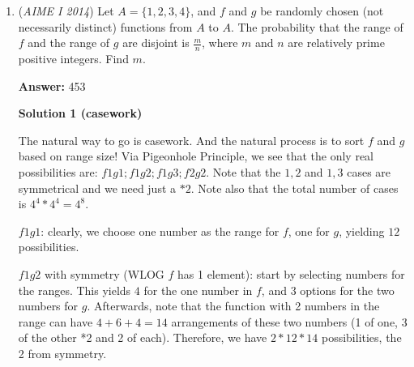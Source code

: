 \begin{enumerate}
For any point $(x,y)$ on the coordinate plane, we can represent it as the term $a^xb^y$. Then, moving right is equivalent to multiplying by $a$, moving left is equivalent to multiplying by $1/a$, and similarly for up/down with $b$ and $1/b$. Because, on every move, the possibilities are these four directions, and each is equally likely, each move can be represented by multiplying by $a+\frac{1}{a}+b+\frac{1}{b}$. Thus, the possibilities after $6$ moves are the same as the coefficients of $\left(a+\frac{1}{a}+b+\frac{1}{b}\right)^6$. By symmetry, we just need to find the number of ways for the token to reach $(0,0),(1,1),(2,2),\text{ and }(3,3)$. By the multinomial theorem, the coefficient of $a^3b^3$ is $\binom{6}{3,3}=20$. Similarly, the coefficient of $a^2b^2$ is $2\binom{6}{3,2,1}=120$. The coefficient of $ab$ is $\binom{6}{2,2,1,1}+2\binom{6}{3,2,1}=300$. Finally, the constant term is $2\binom{6}{2,2,1,1}+2\binom{6}{3,3}=400$. Because the total number of possibilities is $4^6$, the probability is 
 \[\frac{4(20+120+300)+400}{4^6}=\frac{5+30+75+25}{4^4}=\frac{135}{256},\]and the answer is $391$.--brainiacmaniac31

 


 


	\item (\textit{AIME I 2014}) Let $A=\{1,2,3,4\}$, and $f$ and $g$ be randomly chosen (not necessarily distinct) functions from $A$ to $A$. The probability that the range of $f$ and the range of $g$ are disjoint is $\frac{m}{n}$, where $m$ and $n$ are relatively prime positive integers. Find $m$.


 
 \textbf{Answer: }453



\textbf{Solution 1 (casework)}

The natural way to go is casework. And the natural process is to sort $f$ and $g$ based on range size! Via Pigeonhole Principle, we see that the only real possibilities are: $f 1 g 1; f 1 g 2; f 1 g 3; f 2 g 2$. Note that the $1, 2$ and $1, 3$ cases are symmetrical and we need just a $*2$. Note also that the total number of cases is $4^4*4^4=4^8$.

 $f 1 g 1$: clearly, we choose one number as the range for $f$, one for $g$, yielding $12$ possibilities.

 $f 1 g 2$ with symmetry (WLOG $f$ has 1 element): start by selecting numbers for the ranges. This yields $4$ for the one number in $f$, and $3$ options for the two numbers for $g$. Afterwards, note that the function with 2 numbers in the range can have $4+6+4=14$ arrangements of these two numbers (1 of one, 3 of the other *2 and 2 of each). Therefore, we have $2*12*14$ possibilities, the 2 from symmetry.


\end{enumerate}
